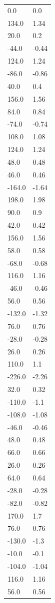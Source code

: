 \begin{longtable}{ll}
0.0 & 0.0 \\
134.0 & 1.34 \\
20.0 & 0.2 \\
-44.0 & -0.44 \\
124.0 & 1.24 \\
-86.0 & -0.86 \\
40.0 & 0.4 \\
156.0 & 1.56 \\
84.0 & 0.84 \\
-74.0 & -0.74 \\
108.0 & 1.08 \\
124.0 & 1.24 \\
48.0 & 0.48 \\
46.0 & 0.46 \\
-164.0 & -1.64 \\
198.0 & 1.98 \\
90.0 & 0.9 \\
42.0 & 0.42 \\
156.0 & 1.56 \\
58.0 & 0.58 \\
-68.0 & -0.68 \\
116.0 & 1.16 \\
-46.0 & -0.46 \\
56.0 & 0.56 \\
-132.0 & -1.32 \\
76.0 & 0.76 \\
-28.0 & -0.28 \\
26.0 & 0.26 \\
110.0 & 1.1 \\
-226.0 & -2.26 \\
32.0 & 0.32 \\
-110.0 & -1.1 \\
-108.0 & -1.08 \\
-46.0 & -0.46 \\
48.0 & 0.48 \\
66.0 & 0.66 \\
26.0 & 0.26 \\
64.0 & 0.64 \\
-28.0 & -0.28 \\
-82.0 & -0.82 \\
170.0 & 1.7 \\
76.0 & 0.76 \\
-130.0 & -1.3 \\
-10.0 & -0.1 \\
-104.0 & -1.04 \\
116.0 & 1.16 \\
56.0 & 0.56 \\

\end{longtable}
